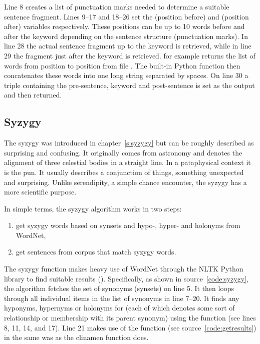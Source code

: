 Line 8 creates a list of punctuation marks needed to determine a suitable sentence fragment. Lines 9--17 and 18--26 set the  (position before) and  (position after) variables respectively. These positions can be up to 10 words before and after the keyword  depending on the sentence structure (punctuation marks). In line 28 the actual sentence fragment up to the keyword is retrieved, while in line 29 the fragment just after the keyword is retrieved.  for example returns the list of words from position  to position  from file . The built-in Python  function then concatenates these words into one long string separated by spaces. On line 30 a triple containing the pre-sentence, keyword and post-sentence is set as the output and then returned.


\subsection{Syzygy}
\label{s:syzygyalgo}

The syzygy was introduced in chapter~\ref{s:syzygy} but can be roughly described as surprising and confusing. It originally comes from astronomy and denotes the alignment of three celestial bodies in a straight line. In a pataphysical context it is the pun. It usually describes a conjunction of things, something unexpected and surprising. Unlike serendipity, a simple chance encounter, the syzygy has a more scientific purpose.

In simple terms, the syzygy algorithm works in two steps:
\begin{enumerate}
  \item get syzygy words based on synsets and hypo-, hyper- and holonyms from WordNet,
  \item get sentences from corpus that match syzygy words.
\end{enumerate}

The syzygy function makes heavy use of WordNet \autocite{Miller1995} through the \ac{NLTK} Python library \autocite{NLTK2016} to find suitable results (). Specifically, as shown in source~\ref{code:syzygy}, the algorithm fetches the set of synonyms (synsets) on line 5. It then loops through all individual items  in the list of synonyms  in line 7--20. It finds any hyponyms, hypernyms or holonyms for  (each of which denotes some sort of relationship or membership with its parent synonym) using the  function (see lines 8, 11, 14, and 17). Line 21 makes use of the  function (see source~\ref{code:getresults}) in the same was as the clinamen function does.

